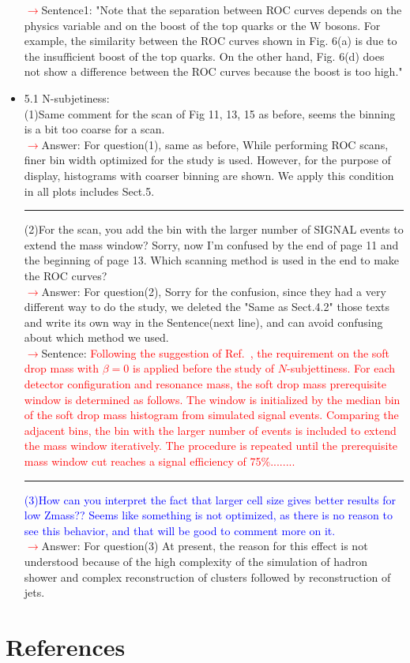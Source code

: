 \documentclass[final,1p,11pt]{elsarticle}
\begin{document}
\begin{itemize}
 \textcolor{red}{$\rightarrow$}Sentence1: "Note that the separation between ROC curves depends on the physics variable and on the boost of the top quarks or the W bosons. For example, the similarity between the ROC curves shown in Fig. 6(a) is due to the insufficient boost of the top quarks. On the other hand, Fig. 6(d) does not show a difference between the ROC curves because the boost is too high."\\
\item 5.1 N-subjetiness: \\
(1)Same comment for the scan of Fig 11, 13, 15 as before, seems the binning is a bit too coarse for a scan.\\ 
 \textcolor{red}{$\rightarrow$}Answer: For question(1), same as before, While performing ROC scans, finer bin width optimized for the study is used. However, for the purpose of display, histograms with coarser binning are shown. We apply this condition in all plots includes Sect.5.\\
 \rule{\textwidth}{0.4pt}
(2)For the scan, you add the bin with the larger number of SIGNAL events to extend the mass window? Sorry, now I'm confused by the end of page 11 and the beginning of page 13. Which scanning method is used in the end to make the ROC curves?\\ 
 \textcolor{red}{$\rightarrow$}Answer: For question(2), Sorry for the confusion, since they had a very different way to do the study, we deleted the "Same as Sect.4.2" those texts and write its own way in the Sentence(next line), and can avoid confusing about which method we used.\\
 \textcolor{red}{$\rightarrow$}Sentence: \textcolor{red}{Following the suggestion of Ref.~\cite{Dreyer:2018tjj}, the requirement on the 
soft drop mass with $\beta=0$ is applied before the study of $N$-subjettiness. 
For each detector configuration and resonance mass, the soft drop mass prerequisite window is determined as follows. The window is initialized by the median bin of the soft drop mass histogram from simulated signal events. Comparing the adjacent bins, the bin with the larger number of events is included to extend the mass window iteratively. The procedure is repeated until the prerequisite mass window cut reaches a signal efficiency of 75\%........} \\
 \rule{\textwidth}{0.4pt}
\textcolor{blue}{(3)How can you interpret the fact that larger cell size gives better results for low Zmass?? Seems like something is not optimized, as there is no reason to see this behavior, and that will be good to comment more on it.}\\
 \textcolor{red}{$\rightarrow$}Answer: For question(3) At present, the reason for this effect is not understood because of the high complexity of the simulation of hadron shower  and complex reconstruction of clusters followed by reconstruction of jets.\\ 
\end{itemize}


\section*{References}


\def\bibname{\Large\bf References}
\def\refname{\Large\bf References}
\pagestyle{plain}

\end{document}

